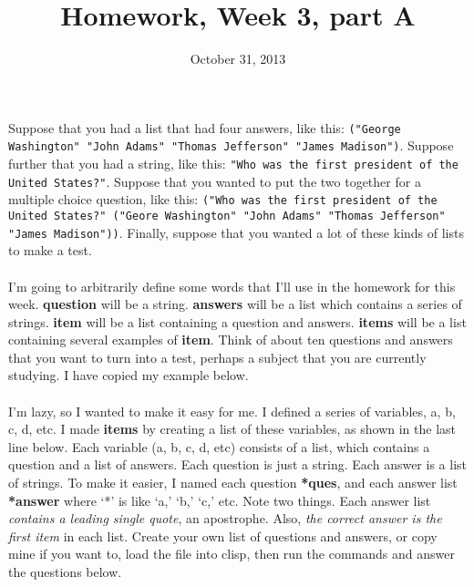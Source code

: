 \documentclass{article}
\title{Homework, Week 3, part A}
\date{October 31, 2013}
\begin{document}
\maketitle{}

\paragraph{}Suppose that you had a list that had four answers, like this: \texttt{("George Washington" "John Adams" "Thomas Jefferson" "James Madison")}. Suppose further that you had a string, like this: \texttt{"Who was the first president of the United States?"}. Suppose that you wanted to put the two together for a multiple choice question, like this: \texttt{("Who was the first president of the United States?"  ("Geore Washington" "John Adams" "Thomas Jefferson" "James Madison"))}. Finally, suppose that you wanted a lot of these kinds of lists to make a test.

\paragraph{}I'm going to arbitrarily define some words that I'll use in the homework for this week. \textbf{question} will be a string. \textbf{answers} will be a list which contains a series of strings. \textbf{item} will be a list containing a question and answers. \textbf{items} will be a list containing several examples of \textbf{item}. Think of about ten questions and answers that you want to turn into a test, perhaps a subject that you are currently studying. I have copied my example below.

\paragraph{}I'm lazy, so I wanted to make it easy for me. I defined a series of variables, a, b, c, d, etc. I made \textbf{items} by creating a list of these variables, as shown in the last line below. Each variable (a, b, c, d, etc) consists of a list, which contains a question and a list of answers. Each question is just a string. Each answer is a list of strings. To make it easier, I named each question \textbf{*ques}, and each answer list \textbf{*answer} where `*' is like `a,' `b,' `c,' etc.  Note two things. Each answer list \textit{contains a leading single quote}, an apostrophe. Also, \textit{the correct answer is the first item} in each list. Create your own list of questions and answers, or copy mine if you want to, load the file into clisp, then run the commands and answer the questions below.
\end{document}
